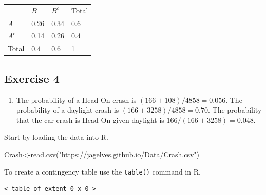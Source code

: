 \documentclass[
  letterpaper,
  DIV=11,
  numbers=noendperiod]{scrreprt}
\newenvironment{Shaded}{\begin{snugshade}}{\end{snugshade}}
\newcommand{\AttributeTok}[1]{\textcolor[rgb]{0.40,0.45,0.13}{#1}}
\newcommand{\FunctionTok}[1]{\textcolor[rgb]{0.28,0.35,0.67}{#1}}
\newcommand{\NormalTok}[1]{\textcolor[rgb]{0.00,0.23,0.31}{#1}}
\newcommand{\OtherTok}[1]{\textcolor[rgb]{0.00,0.23,0.31}{#1}}
\newcommand{\SpecialCharTok}[1]{\textcolor[rgb]{0.37,0.37,0.37}{#1}}
\newcommand{\StringTok}[1]{\textcolor[rgb]{0.13,0.47,0.30}{#1}}
\providecommand{\tightlist}{%
  \setlength{\itemsep}{0pt}\setlength{\parskip}{0pt}}\usepackage{longtable,booktabs,array}
\begin{document}
\begin{longtable}[]{@{}llll@{}}
\toprule()
\endhead
& \(B\) & \(B^c\) & Total \\
\(A\) & 0.26 & 0.34 & 0.6 \\
\(A^c\) & 0.14 & 0.26 & 0.4 \\
Total & 0.4 & 0.6 & 1 \\
\bottomrule()
\end{longtable}

\hypertarget{exercise-4-5}{%
\subsection*{Exercise 4}\label{exercise-4-5}}

\begin{enumerate}
\def\labelenumi{\arabic{enumi}.}
\tightlist
\item
  The probability of a Head-On crash is \((166+108)/4858=0.056\). The
  probability of a daylight crash is \((166+3258)/4858=0.70\). The
  probability that the car crash is Head-On given daylight is
  \(166/(166+3258)=0.048\).
\end{enumerate}

Start by loading the data into R.

\begin{Shaded}
\begin{Highlighting}[numbers=left,,]
\NormalTok{Crash}\OtherTok{\textless{}{-}}\FunctionTok{read.csv}\NormalTok{(}\StringTok{"https://jagelves.github.io/Data/Crash.csv"}\NormalTok{)}
\end{Highlighting}
\end{Shaded}

To create a contingency table use the \texttt{table()} command in R.

\begin{Shaded}
\end{Shaded}

\begin{verbatim}
< table of extent 0 x 0 >
\end{verbatim}
\end{document}
